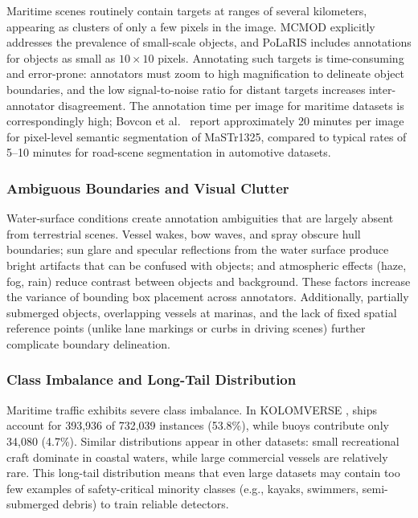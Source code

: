 Maritime scenes routinely contain targets at ranges of several kilometers, appearing as
clusters of only a few pixels in the image. MCMOD \cite{Sun2023MCMOD} explicitly
addresses the prevalence of small-scale objects, and PoLaRIS \cite{Choi2024PoLaRIS}
includes annotations for objects as small as $10 \times 10$ pixels. Annotating such
targets is time-consuming and error-prone: annotators must zoom to high magnification
to delineate object boundaries, and the low signal-to-noise ratio for distant targets
increases inter-annotator disagreement. The annotation time per image for maritime
datasets is correspondingly high; Bovcon et al.~\cite{Bovcon2019MaSTr1325} report
approximately 20 minutes per image for pixel-level semantic segmentation of MaSTr1325,
compared to typical rates of 5--10 minutes for road-scene segmentation in automotive
datasets.

\subsubsection{Ambiguous Boundaries and Visual Clutter}

Water-surface conditions create annotation ambiguities that are largely absent from
terrestrial scenes. Vessel wakes, bow waves, and spray obscure hull boundaries; sun
glare and specular reflections from the water surface produce bright artifacts that
can be confused with objects; and atmospheric effects (haze, fog, rain) reduce contrast
between objects and background. These factors increase the variance of bounding box
placement across annotators. Additionally, partially submerged objects, overlapping
vessels at marinas, and the lack of fixed spatial reference points (unlike lane
markings or curbs in driving scenes) further complicate boundary delineation.

\subsubsection{Class Imbalance and Long-Tail Distribution}

Maritime traffic exhibits severe class imbalance. In KOLOMVERSE
\cite{Nanda2024KOLOMVERSE}, ships account for 393,936 of 732,039 instances (53.8\%),
while buoys contribute only 34,080 (4.7\%). Similar distributions appear in other
datasets: small recreational craft dominate in coastal waters, while large commercial
vessels are relatively rare. This long-tail distribution means that even large datasets
may contain too few examples of safety-critical minority classes (e.g., kayaks,
swimmers, semi-submerged debris) to train reliable detectors.

